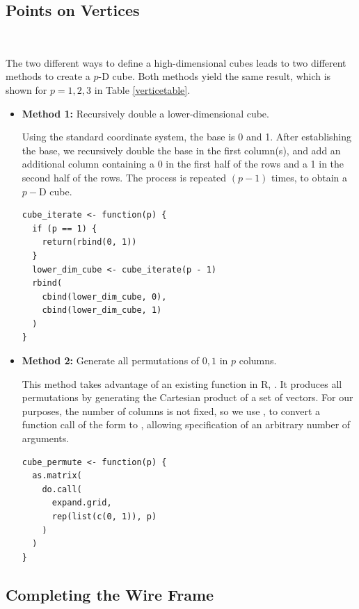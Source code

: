 \subsection{Points on Vertices}~\label{cube-vertices}

The two different ways to define a high-dimensional cubes leads to two
different methods to create a $p$-D cube. Both methods yield the same
result, which is shown for $p=1,2,3$ in Table \ref{verticetable}.

\begin{itemize}

  \item {\bf Method 1:} Recursively double a lower-dimensional cube.

    Using the standard coordinate system, the base is 0 and 1. After
    establishing the base, we recursively double the base in the first
    column(s), and add an additional column containing a 0 in the
    first half of the rows and a 1 in the second half of the rows. The
    process is repeated $(p-1)$ times, to obtain a $p-$D cube.

\begin{verbatim}
cube_iterate <- function(p) {
  if (p == 1) {
    return(rbind(0, 1))
  }
  lower_dim_cube <- cube_iterate(p - 1)
  rbind(
    cbind(lower_dim_cube, 0),
    cbind(lower_dim_cube, 1)
  )
}
\end{verbatim}

  \item {\bf Method 2:} Generate all permutations of ${0, 1}$ in $p$ columns.

    This method takes advantage of an existing function in R,
    . It produces all permutations by generating the
    Cartesian product of a set of vectors. For our purposes, the
    number of columns is not fixed, so we use , to
    convert a function call of the form  to
    , allowing specification of an
    arbitrary number of arguments.

  \begin{verbatim}
cube_permute <- function(p) {
  as.matrix(
    do.call(
      expand.grid,
      rep(list(c(0, 1)), p)
    )
  )
}
\end{verbatim}
\end{itemize}

\subsection{Completing the Wire Frame}

